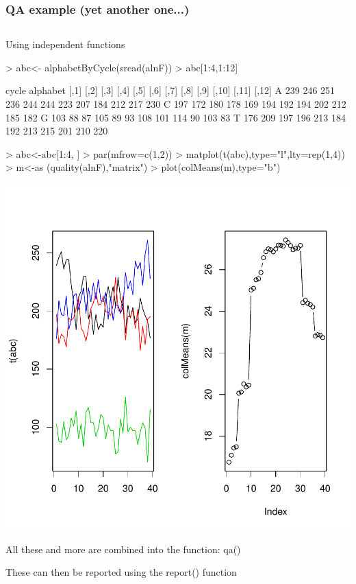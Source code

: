 \documentclass{beamer}
\begin{document}
\begin{frame}[fragile]
\frametitle{QA example (yet another one...)}
\begin{column}{1\textwidth}
  \bit
      \item   Using independent functions
      \begin{uncoverenv}
\begin{Schunk}
\begin{Sinput}
> abc<- alphabetByCycle(sread(alnF))
> abc[1:4,1:12]
\end{Sinput}
\begin{Soutput}
        cycle
alphabet [,1] [,2] [,3] [,4] [,5] [,6] [,7] [,8] [,9] [,10] [,11] [,12]
       A  239  246  251  236  244  244  223  207  184   212   217   230
       C  197  172  180  178  169  194  192  194  202   212   185   182
       G  103   88   87  105   89   93  108  101  114    90   103    83
       T  176  209  197  196  213  184  192  213  215   201   210   220
\end{Soutput}
\begin{Sinput}
> abc<-abc[1:4, ]
> par(mfrow=c(1,2))
> matplot(t(abc),type="l",lty=rep(1,4))
> m<-as (quality(alnF),"matrix")
> plot(colMeans(m),type="b")
\end{Sinput}
\end{Schunk}
\includegraphics{2.Bioconductor_BLAU-059}
       \end{uncoverenv} 
       \item All these and more are combined into the function: qa()
       \item These can then be reported using the report() function
  \eit
  \end{column}
\end{frame}
\end{document}
